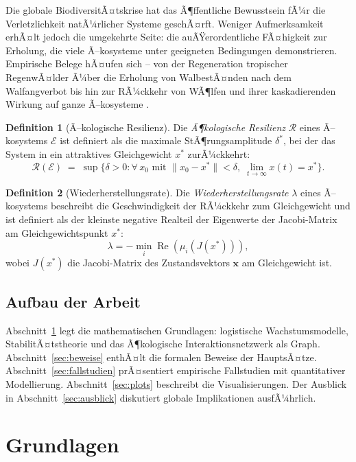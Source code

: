 ﻿\documentclass[a4paper,12pt]{article}
\theoremstyle{definition}
\newtheorem{definition}{Definition}
\begin{document}
Die globale BiodiversitÃ¤tskrise hat das Ã¶ffentliche Bewusstsein fÃ¼r die Verletzlichkeit natÃ¼rlicher Systeme geschÃ¤rft. Weniger Aufmerksamkeit erhÃ¤lt jedoch die umgekehrte Seite: die auÃŸerordentliche FÃ¤higkeit zur Erholung, die viele Ã–kosysteme unter geeigneten Bedingungen demonstrieren. Empirische Belege hÃ¤ufen sich -- von der Regeneration tropischer RegenwÃ¤lder Ã¼ber die Erholung von WalbestÃ¤nden nach dem Walfangverbot bis hin zur RÃ¼ckkehr von WÃ¶lfen und ihrer kaskadierenden Wirkung auf ganze Ã–kosysteme \cite{ripple2014wolves}.

\begin{definition}[Ã–kologische Resilienz]
	Die \emph{Ã¶kologische Resilienz} $\mathcal{R}$ eines Ã–kosystems $\mathcal{E}$ ist definiert als die maximale StÃ¶rungsamplitude $\delta^*$, bei der das System in ein attraktives Gleichgewicht $x^*$ zurÃ¼ckkehrt:
	\[
	\mathcal{R}(\mathcal{E}) \;=\; \sup\bigl\{\delta > 0 : \forall\, x_0 \text{ mit } \|x_0 - x^*\| < \delta,\; \lim_{t\to\infty} x(t) = x^*\bigr\}.
	\]
\end{definition}

\begin{definition}[Wiederherstellungsrate]
	Die \emph{Wiederherstellungsrate} $\lambda$ eines Ã–kosystems beschreibt die Geschwindigkeit der RÃ¼ckkehr zum Gleichgewicht und ist definiert als der kleinste negative Realteil der Eigenwerte der Jacobi-Matrix am Gleichgewichtspunkt $x^*$:
	\[
	\lambda = -\min_{i}\operatorname{Re}(\mu_i(J(x^*))),
	\]
	wobei $J(x^*)$ die Jacobi-Matrix des Zustandsvektors $\mathbf{x}$ am Gleichgewicht ist.
\end{definition}

\subsection{Aufbau der Arbeit}

Abschnitt~\ref{sec:grundlagen} legt die mathematischen Grundlagen: logistische Wachstumsmodelle, StabilitÃ¤tstheorie und das Ã¶kologische Interaktionsnetzwerk als Graph.
Abschnitt~\ref{sec:beweise} enthÃ¤lt die formalen Beweise der HauptsÃ¤tze.
Abschnitt~\ref{sec:fallstudien} prÃ¤sentiert empirische Fallstudien mit quantitativer Modellierung.
Abschnitt~\ref{sec:plots} beschreibt die Visualisierungen.
Der Ausblick in Abschnitt~\ref{sec:ausblick} diskutiert globale Implikationen ausfÃ¼hrlich.

\section{Grundlagen}
\label{sec:grundlagen}
\end{document}
